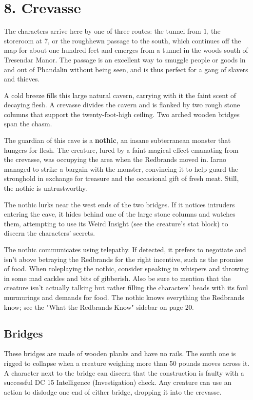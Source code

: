 \documentclass[10pt,a4paper,twoside,bg=print,twocolumn,openany,nodeprecatedcode]{dndbook}
\begin{document}
\section{8. Crevasse}
The characters arrive here by one of three routes: the tunnel from 1, the storeroom at 7, or the roughhewn passage to the south, which continues off the map for about one hundred feet and emerges from a tunnel in the woods south of Tresendar Manor. The passage is an excellent way to smuggle people or goods in and out of Phandalin without being seen, and is thus perfect for a gang of slavers and thieves.

\begin{DndReadAloud}{}
A cold breeze fills this large natural cavern, carrying with it the faint scent of decaying flesh. A crevasse divides the cavern and is flanked by two rough stone columns that support the twenty-foot-high ceiling. Two arched wooden bridges span the chasm.

\end{DndReadAloud}

The guardian of this cave is a \textbf{nothic}, an insane subterranean monster that hungers for flesh. The creature, lured by a faint magical effect emanating from the crevasse, was occupying the area when the Redbrands moved in. Iarno managed to strike a bargain with the monster, convincing it to help guard the stronghold in exchange for treasure and the occasional gift of fresh meat. Still, the nothic is untrustworthy.

The nothic lurks near the west ends of the two bridges. If it notices intruders entering the cave, it hides behind one of the large stone columns and watches them, attempting to use its Weird Insight (see the creature's stat block) to discern the characters' secrets.

The nothic communicates using telepathy. If detected, it prefers to negotiate and isn't above betraying the Redbrands for the right incentive, such as the promise of food. When roleplaying the nothic, consider speaking in whispers and throwing in some mad cackles and bits of gibberish. Also be sure to mention that the creature isn't actually talking but rather filling the characters' heads with its foul murmurings and demands for food. The nothic knows everything the Redbrands know; see the "What the Redbrands Know" sidebar on page 20.

\subsection{Bridges}
These bridges are made of wooden planks and have no rails. The south one is rigged to collapse when a creature weighing more than 50 pounds moves across it. A character next to the bridge can discern that the construction is faulty with a successful DC 15 Intelligence (Investigation) check. Any creature can use an action to dislodge one end of either bridge, dropping it into the crevasse.
\end{document}
